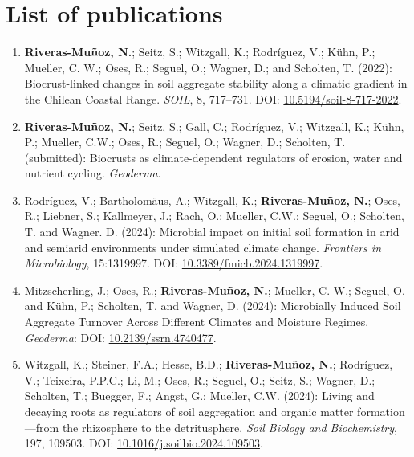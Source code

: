 \chapter*{List of publications}

\begin{enumerate}

\item \textbf{Riveras-Muñoz, N.}; Seitz, S.; Witzgall, K.; Rodríguez, V.; Kühn, P.; Mueller, C. W.; Oses, R.; Seguel, O.; Wagner, D.; and Scholten, T. (2022): Biocrust-linked changes in soil aggregate stability along a climatic gradient in the Chilean Coastal Range. \textit{SOIL}, 8, 717--731. DOI: \href{https://doi.org/10.5194/soil-8-717-2022}{10.5194/soil-8-717-2022}.

\item \textbf{Riveras-Muñoz, N.}; Seitz, S.; Gall, C.; Rodríguez, V.; Witzgall, K.; Kühn, P.; Mueller, C.W.; Oses, R.; Seguel, O.; Wagner, D.; Scholten, T. (submitted): Biocrusts as climate-dependent regulators of erosion, water and nutrient cycling. \textit{Geoderma}.

\item Rodríguez, V.; Bartholomäus, A.; Witzgall, K.; \textbf{Riveras-Muñoz, N.}; Oses, R.; Liebner, S.; Kallmeyer, J.; Rach, O.; Mueller, C.W.; Seguel, O.; Scholten, T. and Wagner. D. (2024): Microbial impact on initial soil formation in arid and semiarid environments under simulated climate change. \textit{Frontiers in Microbiology}, 15:1319997. DOI: \href{https://doi.org/10.3389/fmicb.2024.1319997}{10.3389/fmicb.2024.1319997}.

\item Mitzscherling, J.; Oses, R.; \textbf{Riveras-Muñoz, N.}; Mueller, C. W.; Seguel, O. and Kühn, P.; Scholten, T. and Wagner, D. (2024): Microbially Induced Soil Aggregate Turnover Across Different Climates and Moisture Regimes.  \textit{Geoderma}: DOI: \href{https://doi.org/10.2139/ssrn.4740477}{10.2139/ssrn.4740477}.

\item Witzgall, K.; Steiner, F.A.; Hesse, B.D.; \textbf{Riveras-Muñoz, N.}; Rodríguez, V.; Teixeira, P.P.C.; Li, M.; Oses, R.; Seguel, O.; Seitz, S.; Wagner, D.; Scholten, T.; Buegger, F.; Angst, G.; Mueller, C.W. (2024): Living and decaying roots as regulators of soil aggregation and organic matter formation---from the rhizosphere to the detritusphere. \textit{Soil Biology and Biochemistry}, 197, 109503. DOI: \href{https://doi.org/10.1016/j.soilbio.2024.109503}{10.1016/j.soilbio.2024.109503}.

\end{enumerate}
